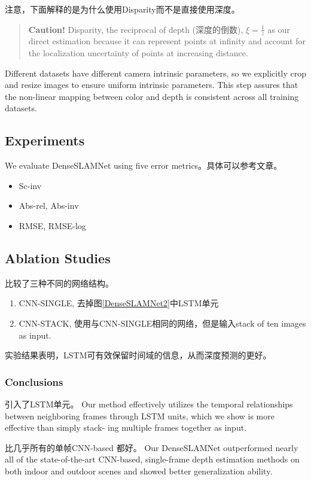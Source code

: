 注意，下面解释的是为什么使用Disparity而不是直接使用深度。
\begin{quote}
{\color{red} \textbf{Caution!} Disparity, the reciprocal of depth (深度的倒数), $\xi = \frac{1}{z}$  as our direct estimation because it can represent points at infinity and account for the localization uncertainty of points at increasing
distance.}
\end{quote}

Different datasets have different camera intrinsic parameters, so we
explicitly crop and resize images to ensure uniform intrinsic parameters. This
step assures that the non-linear mapping between color and depth is consistent
across all training datasets.

\subsection{Experiments}

We evaluate DenseSLAMNet using five error metrics。具体可以参考文章。
\begin{itemize}
\item Sc-inv
\item Abs-rel, Abs-inv
\item RMSE, RMSE-log
\end{itemize}

\subsection{Ablation Studies}

比较了三种不同的网络结构。
\begin{enumerate}
\item CNN-SINGLE, 去掉图\ref{DenseSLAMNet2}中LSTM单元
\item CNN-STACK, 使用与CNN-SINGLE相同的网络，但是输入stack of ten images as input.
\end{enumerate}

实验结果表明，LSTM可有效保留时间域的信息，从而深度预测的更好。

\subsubsection{Conclusions}

引入了LSTM单元。
Our method effectively utilizes the temporal relationships between neighboring
frames through LSTM units, which we show is more effective than simply stack-
ing multiple frames together as input.

比几乎所有的单帧CNN-based 都好。
Our DenseSLAMNet outperformed nearly
all of the state-of-the-art CNN-based, single-frame depth estimation methods on
both indoor and outdoor scenes and showed better generalization ability.


